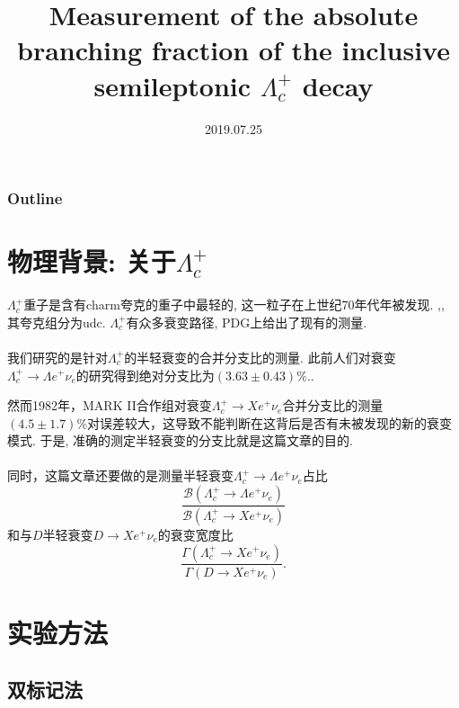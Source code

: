 \documentclass{beamer}
\title{Measurement of the absolute branching fraction of the inclusive semileptonic $\Lambda_c^+$ decay}
\author{\kaishu{严启宇\ 黄吉鸿\ 卢玫澍}}
\institute{中国科学院大学, 北京}
\date{2019.07.25}
\begin{document}

\begin{frame}
    \titlepage
\end{frame}

\begin{frame}
    \frametitle{Outline}
    \tableofcontents
\end{frame}

\section{物理背景: 关于$\Lambda_c^+$}
\begin{frame}
    \sectionpage
\end{frame}

\begin{frame}
\indent $\Lambda_c^+$重子是含有charm夸克的重子中最轻的, 这一粒子在上世纪70年代年被发现. \cite{knapp1976observation},\cite{abrams1980observation}, 其夸克组分为udc. $\Lambda_c^+$有众多衰变路径, PDG上给出了现有的测量.\\
~\\
我们研究的\cite{ablikim2018measurement}是针对$\Lambda_c^+$的半轻衰变的合并分支比的测量. 此前人们对衰变$\Lambda_c^+ \rightarrow \Lambda e^+ \nu_e$的研究得到绝对分支比为$(3.63 \pm 0.43)\%$.\cite{ablikim2015measurement}. 
\end{frame}

\begin{frame}
然而1982年，MARK II合作组对衰变$\Lambda_c^+ \rightarrow X e^+ \nu_e$合并分支比的测量$(4.5 \pm 1.7)\%$对误差较大，这导致不能判断在这背后是否有未被发现的新的衰变模式. 于是, 准确的测定半轻衰变的分支比就是这篇文章的目的.\\
~\\
同时，这篇文章还要做的是测量半轻衰变$\Lambda_c^+\rightarrow\Lambda e^+\nu_e$占比
\begin{displaymath}
\frac{\mathcal{B}(\Lambda_c^+\rightarrow\Lambda e^+\nu_e)}{\mathcal{B}(\Lambda_c^+\rightarrow Xe^+\nu_e)}
\end{displaymath}
和与$D$半轻衰变$D\rightarrow Xe^+\nu_e$的衰变宽度比
\begin{displaymath}
\frac{\Gamma(\Lambda_c^+\rightarrow Xe^+\nu_e)}{\Gamma(D\rightarrow Xe^+\nu_e)}.
\end{displaymath}
\end{frame}

\section{实验方法}
\subsection{双标记法}
\begin{frame}
    \subsectionpage
\end{frame}
\end{document}
